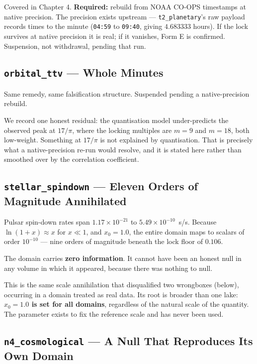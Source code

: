 \documentclass[11pt, letterpaper, openany]{book}
\begin{document}
Covered in Chapter 4. \textbf{Required:} rebuild from NOAA CO-OPS timestamps at native
precision. The precision exists upstream --- \texttt{t2\_planetary}'s raw payload records times
to the minute (\texttt{04:59} to \texttt{09:40}, giving $4.683333$ hours). If the lock survives
at native precision it is real; if it vanishes, Form E is confirmed. Suspension, not withdrawal,
pending that run.

\subsection{\texttt{orbital\_ttv} --- Whole Minutes}

Same remedy, same falsification structure. Suspended pending a native-precision rebuild.

We record one honest residual: the quantisation model under-predicts the observed peak at
$17/\pi$, where the locking multiples are $m = 9$ and $m = 18$, both low-weight. Something at
$17/\pi$ is not explained by quantisation. That is precisely what a native-precision re-run
would resolve, and it is stated here rather than smoothed over by the correlation coefficient.

\subsection{\texttt{stellar\_spindown} --- Eleven Orders of Magnitude Annihilated}

Pulsar spin-down rates span $1.17\times10^{-21}$ to $5.49\times10^{-10}$~s/s. Because
$\ln(1+x) \approx x$ for $x \ll 1$, and $x_0 = 1.0$, the entire domain maps to scalars of order
$10^{-10}$ --- nine orders of magnitude beneath the lock floor of $0.106$.

The domain carries \textbf{zero information}. It cannot have been an honest null in any volume
in which it appeared, because there was nothing to null.

This is the same scale annihilation that disqualified two wrongboxes (below), occurring in a
domain treated as real data. Its root is broader than one lake: \textbf{$x_0 = 1.0$ is set for
all domains}, regardless of the natural scale of the quantity. The parameter exists to fix the
reference scale and has never been used.

\subsection{\texttt{n4\_cosmological} --- A Null That Reproduces Its Own Domain}
\end{document}
